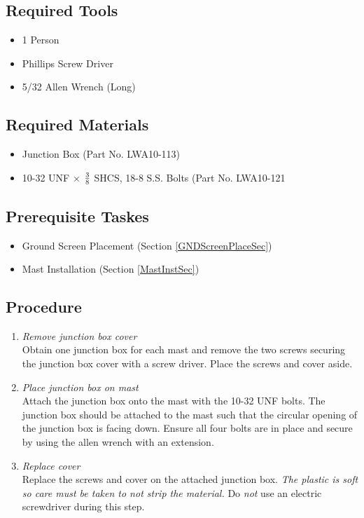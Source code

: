 \documentclass[12pt]{article}
\begin{document}
\begin{enumerate}
	\subsection{Required Tools}
		\begin{itemize}
			\item 1 Person
			\item Phillips Screw Driver
			\item 5/32 Allen Wrench (Long)
		\end{itemize}
	\subsection{Required Materials}
		\begin{itemize}
			\item Junction Box (Part No. LWA10-113)
			\item 10-32 UNF $\times$ $3 \over 8$ SHCS, 18-8 S.S. Bolts (Part No. LWA10-121
		\end{itemize}
	\subsection{Prerequisite Taskes}
		\begin{itemize}
			\item Ground Screen Placement (Section \ref{GNDScreenPlaceSec})
			\item Mast Installation (Section \ref{MastInstSec})
		\end{itemize}
	\subsection{Procedure}
		\begin{enumerate}
			\item \emph{Remove junction box cover} \\ Obtain one junction box for each mast and remove the two screws securing the junction box cover with a screw driver. Place the screws and cover aside.
			\item \emph{Place junction box on mast} \\ Attach the junction box onto the mast with the 10-32 UNF bolts. The junction box should be attached to the mast such that the circular opening of the junction box is facing down. Ensure all four bolts are in place and secure by using the allen wrench with an extension.
			\item \emph{Replace cover} \\ Replace the screws and cover on the attached junction box. \emph{The plastic is soft so care must be taken to not strip the material.} Do \emph{not} use an electric screwdriver during this step.
		\end{enumerate}
			


\end{enumerate}
\end{document}
